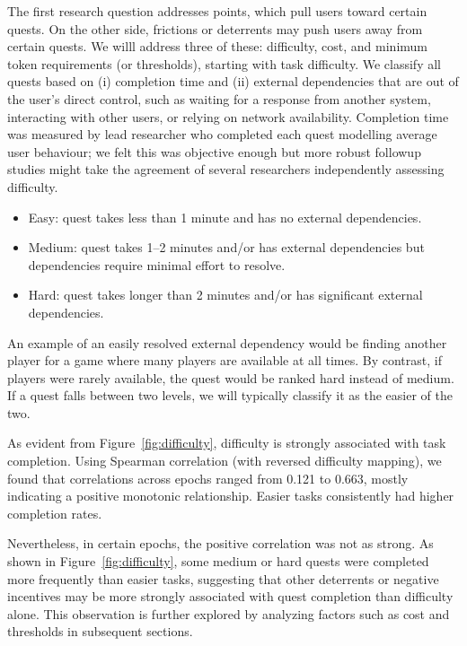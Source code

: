 The first research question addresses points, which pull users toward certain quests. On the other side, frictions or deterrents may push users away from certain quests. We willl address three of these: difficulty, cost, and minimum token requirements (or thresholds), starting with task difficulty. We classify all quests based on (i) completion time and (ii) external dependencies that are out of the user's direct control, such as waiting for a response from another system, interacting with other users, or relying on network availability. Completion time was measured by lead researcher who completed each quest modelling average user behaviour; we felt this was objective enough but more robust followup studies might take the agreement of several researchers independently assessing difficulty.

\begin{itemize}
\item Easy: quest takes less than 1 minute and has no external dependencies.
\item Medium: quest takes 1--2 minutes and/or has external dependencies but dependencies require minimal effort to resolve.
\item Hard: quest takes longer than 2 minutes and/or has significant external dependencies.
\end{itemize}

An example of an easily resolved external dependency would be finding another player for a game where many players are available at all times. By contrast, if players were rarely available, the quest would be ranked hard instead of medium. If a quest falls between two levels, we will typically classify it as the easier of the two. 

As evident from Figure~\ref{fig:difficulty}, difficulty is strongly associated with task completion. Using Spearman correlation (with reversed difficulty mapping), we found that correlations across epochs ranged from 0.121 to 0.663, mostly indicating a positive monotonic relationship. Easier tasks consistently had higher completion rates. 

Nevertheless, in certain epochs, the positive correlation was not as strong. As shown in Figure~\ref{fig:difficulty}, some medium or hard quests were completed more frequently than easier tasks, suggesting that other deterrents or negative incentives may be more strongly associated with quest completion than difficulty alone. This observation is further explored by analyzing factors such as cost and thresholds in subsequent sections.

